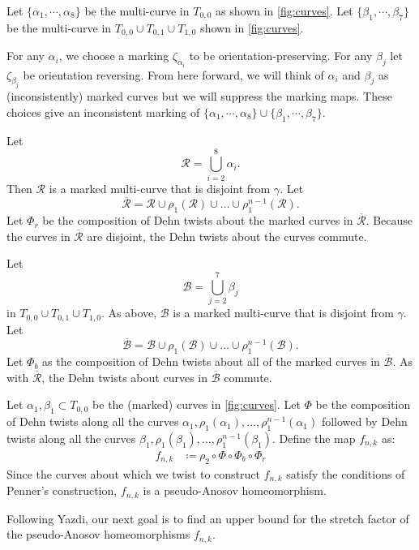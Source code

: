 Let $\{\alpha_1,\cdots,\alpha_8\}$ be the multi-curve in $T_{0,0}$ as shown in \autoref{fig:curves}.  Let $\{\beta_1,\cdots,\beta_7\}$ be the multi-curve in $T_{0,0}\cup T_{0,1}\cup T_{1,0}$ shown in \autoref{fig:curves}. 

For any $\alpha_i$, we choose a marking $\zeta_{\alpha_i}$ to be orientation-preserving.  For any $\beta_j$ let $\zeta_{\beta_j}$ be
orientation reversing. From here forward, we will think of $\alpha_i$ and $\beta_j$ as (inconsistently) marked curves but we will suppress the marking maps. These choices give an inconsistent marking of $\{\alpha_1,\cdots,\alpha_8\}\cup\{\beta_1,\cdots,\beta_7\}$.

Let
$$\mathcal{R}=\displaystyle\bigcup_{i=2}^8\alpha_i.$$ Then $\mathcal{R}$ is a marked multi-curve that is disjoint from $\gamma$.  Let
$$\overline{\mathcal{R}}= \mathcal{R} \cup \rho_1(\mathcal{R}) \cup \dots \cup
\rho_1^{n-1}(\mathcal{R}).$$
Let $\Phi_r$ be the composition of Dehn twists about the marked curves in $\overline{\mathcal{R}}$.  Because the curves in $\overline{\mathcal{R}}$ are disjoint, the Dehn twists about the curves commute.

Let $$\mathcal{B}=\displaystyle\bigcup_{j=2}^7\beta_j$$ in $T_{0,0} \cup T_{0,1} \cup T_{1,0}$. As above, $\mathcal{B}$ is a marked multi-curve that is disjoint from $\gamma$.  Let $$\overline{\mathcal{B}} = \mathcal{B} \cup \rho_1(\mathcal{B}) \cup \dots \cup
\rho_1^{n-1}(\mathcal{B}).$$
Let $\Phi_b$
as the composition of Dehn twists about all of the marked curves in $\overline{\mathcal{B}}$.
As with $\overline{\mathcal{R}}$, the Dehn twists about curves in $\overline{\mathcal{B}}$
commute.




Let $\alpha_1,\beta_1 \subset T_{0,0}$ be the (marked) curves in \autoref{fig:curves}. Let $\Phi$ be the composition
of Dehn twists along all the curves $\alpha_1, \rho_1(\alpha_1), \dots, \rho_1^{n-1}(\alpha_1)$ followed by
Dehn twists along all the curves $\beta_1,\rho_1(\beta_1),\dots,\rho_1^{n-1}(\beta_1)$. Define the map $f_{n,k}$
as:
\begin{align*}
    f_{n,k} &\coloneqq \rho_2 \circ \Phi \circ \Phi_b \circ \Phi_r
\end{align*}
Since the curves about which we twist to construct $f_{n,k}$ satisfy the conditions of Penner's construction, $f_{n,k}$ is a pseudo-Anosov homeomorphism.

Following Yazdi, our next goal is to find an upper bound for the stretch factor of the pseudo-Anosov homeomorphisms $f_{n,k}$.


